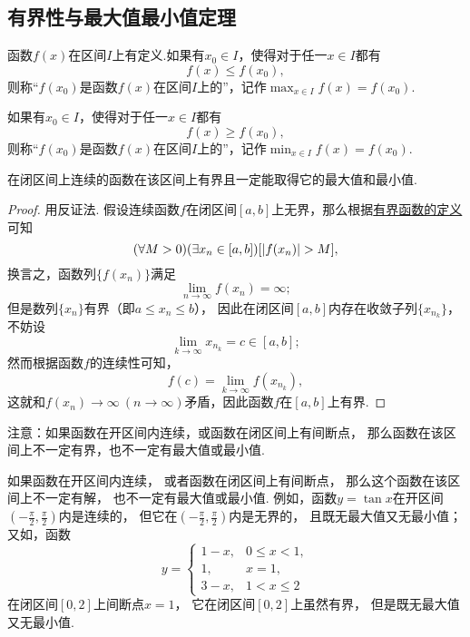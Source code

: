 \subsection{有界性与最大值最小值定理}
\begin{definition}
函数\(f(x)\)在区间\(I\)上有定义.如果有\(x_0 \in I\)，使得对于任一\(x \in I\)都有\[
f(x) \leq f(x_0),
\]则称“\(f(x_0)\)是函数\(f(x)\)在区间\(I\)上的”，记作\(\max_{x \in I}f(x) = f(x_0)\).

如果有\(x_0 \in I\)，使得对于任一\(x \in I\)都有\[
f(x) \geq f(x_0),
\]则称“\(f(x_0)\)是函数\(f(x)\)在区间\(I\)上的”，记作\(\min_{x \in I}f(x) = f(x_0)\).
\end{definition}

\begin{theorem}[有界性与最大值最小值定理]\label{theorem:极限.闭区间上连续函数的性质.有界性与最大值最小值定理}
在闭区间上连续的函数在该区间上有界且一定能取得它的最大值和最小值.
\begin{proof}
用反证法.
假设连续函数\(f\)在闭区间\([a,b]\)上无界，那么根据\hyperref[definition:函数.函数的有界性]{有界函数的定义}可知\[
	(\forall M>0)
	(\exists x_n\in[a,b])
	[\abs{f(x_n)} > M],
\]
换言之，函数列\(\{f(x_n)\}\)满足\[
	\lim\limits_{n\to\infty} f(x_n) = \infty;
\]
但是数列\(\{x_n\}\)有界（即\(a \leq x_n \leq b\)），
因此在闭区间\([a,b]\)内存在收敛子列\(\{x_{n_k}\}\)，
不妨设\[
	\lim\limits_{k\to\infty} x_{n_k} = c \in [a,b];
\]
然而根据函数\(f\)的连续性可知，\[
	f(c) = \lim\limits_{k\to\infty} f(x_{n_k}),
\]
这就和\(f(x_n)\to\infty\ (n\to\infty)\)矛盾，因此函数\(f\)在\([a,b]\)上有界.
\end{proof}
\end{theorem}
注意：如果函数在开区间内连续，或函数在闭区间上有间断点，
那么函数在该区间上不一定有界，也不一定有最大值或最小值.

如果函数在开区间内连续，
或者函数在闭区间上有间断点，
那么这个函数在该区间上不一定有解，
也不一定有最大值或最小值.
例如，函数\(y=\tan x\)在开区间\(\left(-\frac{\pi}{2},\frac{\pi}{2}\right)\)内是连续的，
但它在\(\left(-\frac{\pi}{2},\frac{\pi}{2}\right)\)内是无界的，
且既无最大值又无最小值；
又如，函数\[
	y=\left\{ \begin{array}{ll}
		1-x, & 0\leq x<1, \\
		1, & x=1, \\
		3-x, & 1<x\leq2
	\end{array} \right.
\]在闭区间\([0,2]\)上间断点\(x=1\)，
它在闭区间\([0,2]\)上虽然有界，
但是既无最大值又无最小值.

